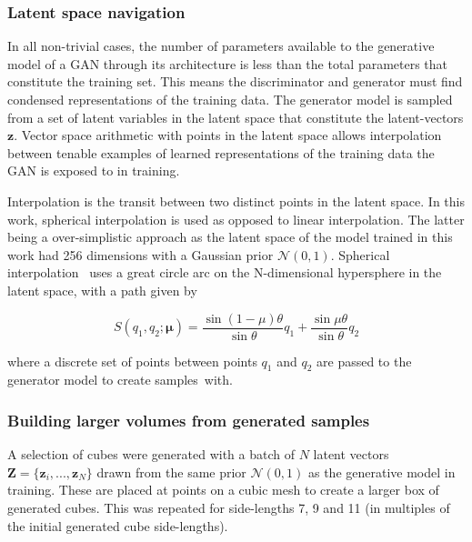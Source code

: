 \documentclass[twocolumn]{article}
\numberwithin{equation}{section}
\begin{document}

\subsubsection{Latent space navigation}\label{methods:z_navig}
In all non-trivial cases, the number of parameters available to the generative model of a GAN through its architecture is 
less than the total parameters that constitute the training set. This means the discriminator and generator must find 
condensed representations of the training data. The generator model is sampled from a set of latent variables in the 
latent space that constitute the latent-vectors $\mathbf{z}$. Vector space arithmetic with points in the latent space 
allows interpolation between tenable examples of learned representations of the training data the GAN is exposed to in 
training. 

Interpolation is the transit between two distinct points in the latent space. In this work, spherical interpolation is used
as opposed to linear interpolation. The latter being a over-simplistic approach as the latent space of the model trained in
this work had 256 dimensions with a Gaussian prior $\mathcal{N}(0,1)$. Spherical interpolation~\cite{spherical_interp} uses 
a great circle arc on the N-dimensional hypersphere in the latent space, with a path given by 

\begin{equation}
    S(q_1, q_2; \mathbf{\mu}) = \frac{\sin (1 - \mu)\theta}{\sin \theta}q_1 + \frac{\sin \mu\theta}{\sin \theta}q_2
\end{equation}

where a discrete set of points between points $q_1$ and $q_2$ are passed to the generator model to create samples~with. 



\subsubsection{Building larger volumes from generated samples}\label{methods:volume_building}
A selection of cubes were generated with a batch of $N$ latent vectors $\mathbf{Z}=\{\mathbf{z}_i, ..., \mathbf{z}_N\}$ 
drawn from the same prior $\mathcal{N}(0,1)$ as the generative model in training. These are placed at points on a cubic 
mesh to create a larger box of generated cubes. This was repeated for side-lengths 7, 9 and 11 (in multiples of the initial 
generated cube side-lengths). 
\end{document}
